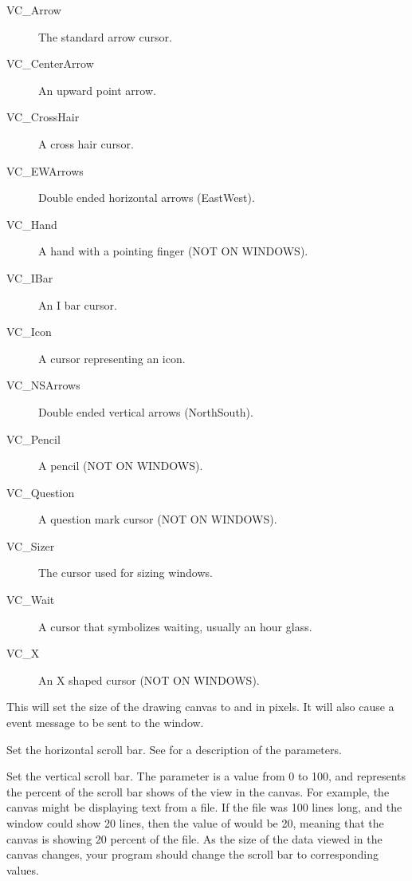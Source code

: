 \begin{description}

\item[VC\_Arrow] The standard arrow cursor.
\item[VC\_CenterArrow] An upward point arrow.
\item[VC\_CrossHair] A cross hair cursor.
\item[VC\_EWArrows] Double ended horizontal arrows (EastWest).
\item[VC\_Hand] A hand with a pointing finger (NOT ON WINDOWS).
\item[VC\_IBar] An I bar cursor.
\item[VC\_Icon] A cursor representing an icon.
\item[VC\_NSArrows] Double ended vertical arrows (NorthSouth).
\item[VC\_Pencil] A pencil (NOT ON WINDOWS).
\item[VC\_Question] A question mark cursor (NOT ON WINDOWS).
\item[VC\_Sizer] The cursor used for sizing windows.
\item[VC\_Wait] A cursor that symbolizes waiting, usually an hour glass.
\item[VC\_X] An X shaped cursor (NOT ON WINDOWS).
\end{description}


This will set the size of the drawing canvas to 
and  in pixels. It will also cause a 
event message to be sent to the window.


Set the horizontal scroll bar. See  for
a description of the parameters.


Set the vertical scroll bar. The  parameter
is a value from 0 to 100, and represents the percent
of the scroll bar shows of the view in the canvas. For
example, the canvas might be displaying text from a file.
If the file was 100 lines long, and the window could show
20 lines, then the value of  would be 20,
meaning that the canvas is showing 20 percent of the file.
As the size of the data viewed in the canvas changes, your
program should change the scroll bar to corresponding values.

